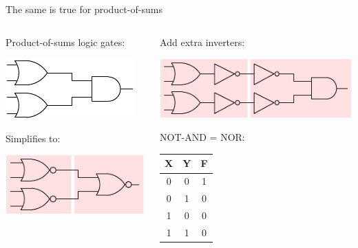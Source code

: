 \begin{frame}{The same is true for product-of-sums}
  \begin{columns}
    \begin{column}[t]{5cm}
      Product-of-sums logic gates: \\
      \begin{center} \includegraphics{ORAND}
      \end{center}
      Simplifies to: \\
      \begin{center}
        \includegraphics{NORNOR}
      \end{center}
    \end{column}
    \begin{column}[t]{5cm}
      Add extra inverters: \\
      \begin{center}
        \includegraphics{ORNOTNOTAND}
      \end{center}
      NOT-AND = NOR: \\
      \begin{center}
        \begin{tabular}{ccc}
          \textbf{X} & \textbf{Y} & \textbf{F} \\
          \hline
          0 & 0 & 1 \\
          0 & 1 & 0 \\
          1 & 0 & 0 \\
          1 & 1 & 0 \\
        \end{tabular}
      \end{center}
    \end{column}
  \end{columns}
\end{frame}

